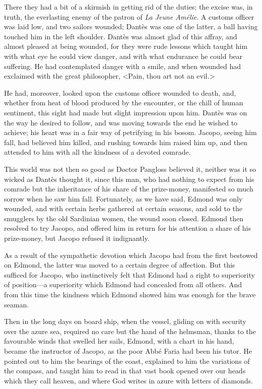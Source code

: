  There they had a bit of a skirmish in getting rid of the duties; the excise was, in truth, the everlasting enemy of the patron of \textit{La Jeune Amélie}. A customs officer was laid low, and two sailors wounded; Dantès was one of the latter, a ball having touched him in the left shoulder. Dantès was almost glad of this affray, and almost pleased at being wounded, for they were rude lessons which taught him with what eye he could view danger, and with what endurance he could bear suffering. He had contemplated danger with a smile, and when wounded had exclaimed with the great philosopher, <Pain, thou art not an evil.> 

 He had, moreover, looked upon the customs officer wounded to death, and, whether from heat of blood produced by the encounter, or the chill of human sentiment, this sight had made but slight impression upon him. Dantès was on the way he desired to follow, and was moving towards the end he wished to achieve; his heart was in a fair way of petrifying in his bosom. Jacopo, seeing him fall, had believed him killed, and rushing towards him raised him up, and then attended to him with all the kindness of a devoted comrade. 

 This world was not then so good as Doctor Pangloss believed it, neither was it so wicked as Dantès thought it, since this man, who had nothing to expect from his comrade but the inheritance of his share of the prize-money, manifested so much sorrow when he saw him fall. Fortunately, as we have said, Edmond was only wounded, and with certain herbs gathered at certain seasons, and sold to the smugglers by the old Sardinian women, the wound soon closed. Edmond then resolved to try Jacopo, and offered him in return for his attention a share of his prize-money, but Jacopo refused it indignantly. 

 As a result of the sympathetic devotion which Jacopo had from the first bestowed on Edmond, the latter was moved to a certain degree of affection. But this sufficed for Jacopo, who instinctively felt that Edmond had a right to superiority of position—a superiority which Edmond had concealed from all others. And from this time the kindness which Edmond showed him was enough for the brave seaman. 

 Then in the long days on board ship, when the vessel, gliding on with security over the azure sea, required no care but the hand of the helmsman, thanks to the favourable winds that swelled her sails, Edmond, with a chart in his hand, became the instructor of Jacopo, as the poor Abbé Faria had been his tutor. He pointed out to him the bearings of the coast, explained to him the variations of the compass, and taught him to read in that vast book opened over our heads which they call heaven, and where God writes in azure with letters of diamonds. 

